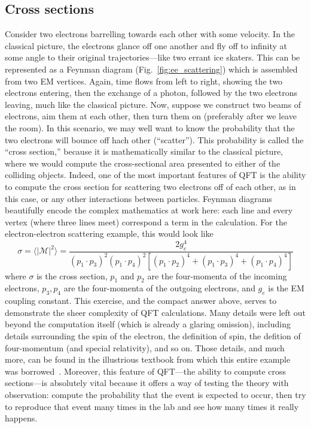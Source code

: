 \subsection{Cross sections}
Consider two electrons barrelling towards each other with some velocity. 
In the classical picture, the electrons glance off one another and fly off to infinity at some angle to their original trajectories---like two errant ice skaters. 
This can be represented as a Feynman diagram (Fig.~\ref{fig:ee_scattering}) which is assembled from two EM vertices. 
Again, time flows from left to right, showing the two electrons entering, then the exchange of a photon, followed by the two electrons leaving, much like the classical picture. 
Now, suppose we construct two beams of electrons, aim them at each other, then turn them on (preferably after we leave the room). 
In this scenario, we may well want to know the probability that the two electrons will bounce off hach other (``scatter''). 
This probability is called the ``cross section,'' because it is mathematically similar to the classical picture\footnotemark{}, where we would compute the cross-sectional area presented to either of the colliding objects. 
Indeed, one of the most important features of QFT is the ability to compute the cross section for scattering two electrons off of each other, as in this case, or any other interactions between particles. 
Feynman diagrams beautifully encode the complex mathematics at work here: each line and every vertex (where three lines meet) correspond a term in the calculation. 
For the electron-electron scattering example, this would look like
\begin{equation}
    \sigma = \langle|\mathcal{M}|^2\rangle = \frac{2g_e^4}{(p_1 \cdot p_3)^2(p_1 \cdot p_4)^2[(p_1 \cdot p_2)^4 + (p_1 \cdot p_3)^4 + (p_1 \cdot p_4)^4]}
\end{equation}
where $\sigma$ is the cross section, $p_1$ and $p_2$ are the four-momenta of the incoming electrons, $p_3, p_4$ are the four-momenta of the outgoing electrons, and $g_e$ is the EM coupling constant. 
This exercise, and the compact answer above, serves to demonstrate the sheer complexity of QFT calculations. 
Many details were left out beyond the computation itself (which is already a glaring omission), including details surrounding the spin of the electron, the definition of spin, the defition of four-momentum (and special relativity), and so on. 
Those details, and much more, can be found in the illustrious textbook from which this entire example was borrowed~\cite{GriffithsParticle}. 
Moreover, this feature of QFT---the ability to compute cross sections---is absolutely vital because it offers a way of testing the theory with observation: compute the probability that the event is expected to occur, then try to reproduce that event many times in the lab and see how many times it really happens. 

